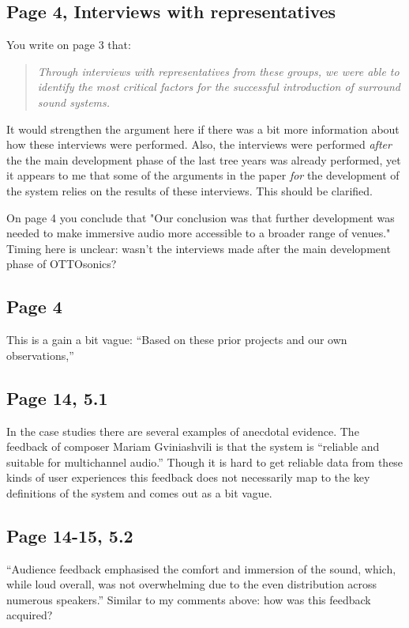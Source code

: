 \documentclass[11pt]{article}
\begin{document}
\subsection*{Page 4, Interviews with representatives}
\label{sec:orgab7352e}
You write on page 3 that: 
\begin{quote}
\emph{Through interviews with representatives from these groups, we were able to identify the most critical factors for the successful introduction of surround sound systems.}
\end{quote}
It would strengthen the argument here if there was a bit more information about how these interviews were performed. Also, the interviews were performed \emph{after} the the main development phase of the last tree years was already performed, yet it appears to me that some of the arguments in the paper \emph{for} the development of the system relies on the results of these interviews. This should be clarified.

On page 4 you conclude that  "Our conclusion was that further development was needed to make immersive
audio more accessible to a broader range of venues." Timing here is unclear: wasn't the interviews made after the main development phase of OTTOsonics?
\subsection*{Page 4}
\label{sec:org5390278}
This is a gain a bit vague: ``Based on these prior projects and our own observations,''
\subsection*{Page 14, 5.1}
\label{sec:orga7f8bef}
In the case studies there are several examples of anecdotal evidence. The feedback of composer Mariam Gviniashvili is that the system is ``reliable and suitable for multichannel audio.'' Though it is hard to get reliable data from these kinds of user experiences this feedback does not necessarily map to the key definitions of the system and comes out as a bit vague.
\subsection*{Page 14-15, 5.2}
\label{sec:orgc3c29ea}
``Audience feedback emphasised the comfort and immersion of the sound, which, while loud overall, was not overwhelming due to the even distribution across numerous speakers.''
\noindent
Similar to my comments above: how was this feedback acquired?
\end{document}

